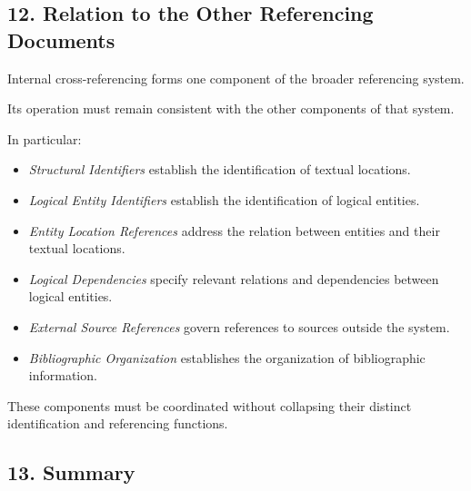 
\subsection*{12. Relation to the Other
Referencing Documents}

Internal cross-referencing forms
one component of the broader
referencing system.

Its operation must remain consistent
with the other components of
that system.

In particular:

\begin{itemize}
    \item \textit{Structural Identifiers}
    establish the identification
    of textual locations.

    \item \textit{Logical Entity
    Identifiers} establish the
    identification of logical
    entities.

    \item \textit{Entity Location
    References} address the relation
    between entities and their
    textual locations.

    \item \textit{Logical Dependencies}
    specify relevant relations
    and dependencies between
    logical entities.

    \item \textit{External Source
    References} govern references
    to sources outside the system.

    \item \textit{Bibliographic
    Organization} establishes
    the organization of bibliographic
    information.
\end{itemize}

These components must be coordinated
without collapsing their distinct
identification and referencing
functions.


\subsection*{13. Summary}

